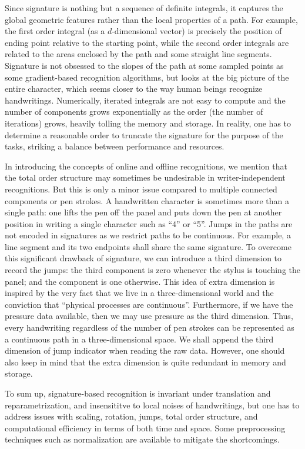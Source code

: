 \documentclass[fleqn]{article}
\theoremstyle{definition}
\theoremstyle{remark}
\begin{document}
\par
Since signature is nothing but a sequence of definite integrals, it captures the global geometric features rather than the local properties of a path. For example, the first order integral (as a $d$-dimensional vector) is precisely the position of ending point relative to the starting point, while the second order integrals are related to the areas enclosed by the path and some straight line segments. Signature is not obsessed to the slopes of the path at some sampled points as some gradient-based recognition algorithms, but looks at the big picture of the entire character, which seems closer to the way human beings recognize handwritings. Numerically, iterated integrals are not easy to compute and the number of components grows exponentially as the order (the number of iterations) grows, heavily tolling the memory and storage. In reality, one has to determine a reasonable order to truncate the signature for the purpose of the tasks, striking a balance between performance and resources.

\par
In introducing the concepts of online and offline recognitions, we mention that the total order structure may sometimes be undesirable in writer-independent recognitions. But this is only a minor issue compared to multiple connected components or pen strokes. A handwritten character is sometimes more than a single path: one lifts the pen off the panel and puts down the pen at another position in writing a single character such as ``4'' or ``5''. Jumps in the paths are not encoded in signatures as we restrict paths to be continuous. For example, a line segment and its two endpoints shall share the same signature. To overcome this significant drawback of signature, we can introduce a third dimension to record the jumps: the third component is zero whenever the stylus is touching the panel; and the component is one otherwise. This idea of extra dimension is inspired by the very fact that we live in a three-dimensional world and the conviction that ``physical processes are continuous''. Furthermore, if we have the pressure data available, then we may use pressure as the third dimension. Thus, every handwriting regardless of the number of pen strokes can be represented as a continuous path in a three-dimensional space. We shall append the third dimension of jump indicator when reading the raw data. However, one should also keep in mind that the extra dimension is quite redundant in memory and storage.

\par
To sum up, signature-based recognition is invariant under translation and reparametrization, and insensititve to local noises of handwritings, but one has to address issues with scaling, rotation, jumps, total order structure, and computational efficiency in terms of both time and space. Some preprocessing techniques such as normalization are available to mitigate the shortcomings.
\end{document}
